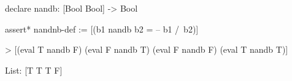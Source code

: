 %
%
\begin{tcAthena}
declare nandb: [Bool Bool] -> Bool

assert* nandnb-def := [(b1 nandb b2 = -- b1 /\ b2)]

> [(eval T nandb F) (eval F nandb T) (eval F nandb F) (eval T nandb T)]

List: [T T T F]
\end{tcAthena}
